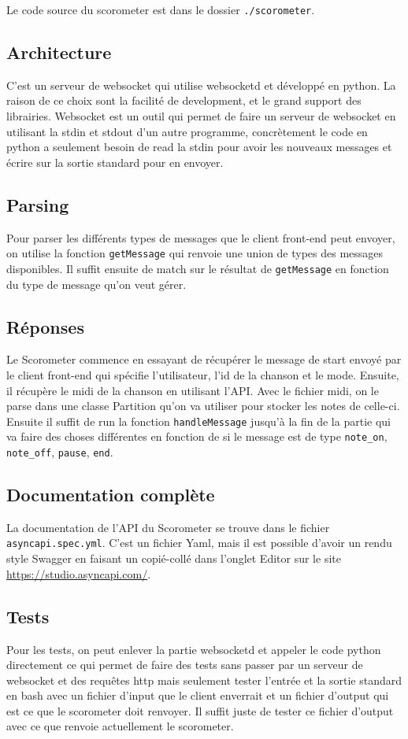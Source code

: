 Le code source du scorometer est dans le dossier \texttt{./scorometer}.

\subsection*{Architecture}
C’est un serveur de websocket qui utilise websocketd et développé en python. La raison de ce choix sont la facilité de development, et le grand support des librairies. 
Websocket est un outil qui permet de faire un serveur de websocket en utilisant la stdin et stdout d’un autre programme, concrètement le code en python a seulement besoin de read la stdin pour avoir les nouveaux messages et écrire sur la sortie standard pour en envoyer.

\subsection*{Parsing}
Pour parser les différents types de messages que le client front-end peut envoyer, on utilise la fonction \texttt{getMessage} qui renvoie une union de types des messages disponibles. Il suffit ensuite de match sur le résultat de \texttt{getMessage} en fonction du type de message qu’on veut gérer.

\subsection*{Réponses}
Le Scorometer commence en essayant de récupérer le message de start envoyé par le client front-end qui spécifie l’utilisateur, l’id de la chanson et le mode. Ensuite, il récupère le midi de la chanson en utilisant l’API. Avec le fichier midi, on le parse dans une classe Partition qu’on va utiliser pour stocker les notes de celle-ci. Ensuite il suffit de run la fonction \texttt{handleMessage} jusqu'à la fin de la partie qui va faire des choses différentes en fonction de si le message est de type \verb|note_on|, \verb|note_off|, \verb|pause|, \verb|end|.

\subsection*{Documentation complète}
La documentation de l’API du Scorometer se trouve dans le fichier \verb|asyncapi.spec.yml|. C’est un fichier Yaml, mais il est possible d’avoir un rendu style Swagger en faisant un copié-collé dans l'onglet Editor sur le site \url{https://studio.asyncapi.com/}.

\subsection*{Tests}
Pour les tests, on peut enlever la partie websocketd et appeler le code python directement ce qui permet de faire des tests sans passer par un serveur de websocket et des requêtes http mais seulement tester l'entrée et la sortie standard en bash avec un fichier d’input que le client enverrait et un fichier d’output qui est ce que le scorometer doit renvoyer. Il suffit juste de tester ce fichier d’output avec ce que renvoie actuellement le scorometer.

